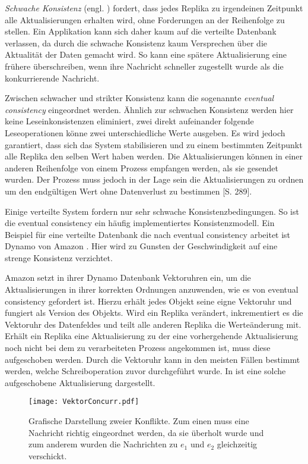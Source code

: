 \textit{Schwache Konsistenz} (engl. ) fordert, dass jedes Replika zu irgendeinen Zeitpunkt alle Aktualisierungen erhalten wird, ohne Forderungen an der Reihenfolge zu stellen.
Ein Applikation kann sich daher kaum auf die verteilte Datenbank verlassen, da durch die schwache Konsistenz kaum Versprechen über die Aktualität der Daten gemacht wird.
So kann eine spätere Aktualisierung eine frühere überschreiben, wenn ihre Nachricht schneller zugestellt wurde als die konkurrierende Nachricht.

Zwischen schwacher und strikter Konsistenz kann die sogenannte \textit{eventual consistency} eingeordnet werden.
Ähnlich zur schwachen Konsistenz werden hier keine Leseinkonsistenzen eliminiert, zwei direkt aufeinander folgende Leseoperationen könne zwei unterschiedliche Werte ausgeben.
Es wird jedoch garantiert, dass sich das System stabilisieren und zu einem bestimmten Zeitpunkt alle Replika den selben Wert haben werden.
Die Aktualisierungen können in einer anderen Reihenfolge von einem Prozess empfangen werden, als sie gesendet wurden.
Der Prozess muss jedoch in der Lage sein die Aktualisierungen zu ordnen um den endgültigen Wert ohne Datenverlust zu bestimmen \cite{Tanenbaum2007}[S. 289].

Einige verteilte System fordern nur sehr schwache Konsistenzbedingungen.
So ist die eventual consistency ein häufig implementiertes Konsistenzmodell.
Ein Beispiel für eine verteilte Datenbank die nach eventual consistency arbeitet ist Dynamo von Amazon \cite{decandia2007dynamo}.
Hier wird zu Gunsten der Geschwindigkeit auf eine strenge Konsistenz verzichtet.

Amazon setzt in ihrer Dynamo Datenbank Vektoruhren ein, um die Aktualisierungen in ihrer korrekten Ordnungen anzuwenden, wie es von eventual consistency gefordert ist.
Hierzu erhält jedes Objekt seine eigne Vektoruhr und fungiert als Version des Objekts.
Wird ein Replika verändert, inkrementiert es die Vektoruhr des Datenfeldes und teilt alle anderen Replika die Werteänderung mit.
Erhält ein Replika eine Aktualisierung zu der eine vorhergehende Aktualisierung noch nicht bei dem zu verarbeiteten Prozess angekommen ist, muss diese aufgeschoben werden.
Durch die Vektoruhr kann in den meisten Fällen bestimmt werden, welche Schreiboperation zuvor durchgeführt wurde.
In  ist eine solche aufgeschobene Aktualisierung dargestellt.

\begin{figure}[ht]
    \centering
    \texttt{[image: VektorConcurr.pdf]}
    \caption[Aufheben von Nachrichten]{Grafische Darstellung zweier Konflikte. Zum einen muss eine Nachricht richtig eingeordnet werden, da sie überholt wurde und zum anderem wurden die Nachrichten zu $e_1$ und $e_2$ gleichzeitig verschickt.}
    \label{fig:vecConcurrent}
\end{figure} 

